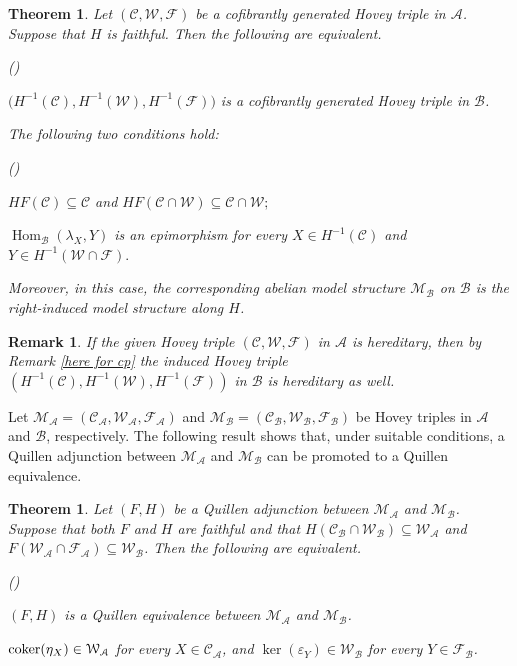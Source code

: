 \documentclass[12pt,twoside]{amsart}
\theoremstyle{bfupright head,slanted body}
\theoremstyle{bfupright head,upright body}
\theoremstyle{fixed bf head,slanted body}
\newtheorem{thm}[res]{Theorem}          \newtheorem*{thm*}{Theorem}
\theoremstyle{fixed bf head,upright body}
\newtheorem{rmk}[res]{Remark}           \newtheorem*{rmk*}{Remark}
\theoremstyle{numbered paragraph}
\newlength{\thmlistleft}        %
\newlength{\thmlistright}       %
\newlength{\thmlistpartopsep}   %
\newlength{\thmlisttopsep}      %
\newlength{\thmlistparsep}      %
\newlength{\thmlistitemsep}     %
\newcounter{eqc}
\newenvironment{eqc}{\begin{list}{\upshape (\textit{\roman{eqc}})}%
    {\usecounter{eqc}%
      \setlength{\leftmargin}{\thmlistleft}%
      \setlength{\labelwidth}{\thmlistleft}%
      \setlength{\rightmargin}{\thmlistright}%
      \setlength{\partopsep}{\thmlistpartopsep}%
      \setlength{\topsep}{\thmlisttopsep}%
      \setlength{\parsep}{\thmlistparsep}%
      \setlength{\itemsep}{\thmlistitemsep}}}%
  {\end{list}}%
\newcounter{prt}
\newenvironment{prt}{\begin{list}{\upshape (\alph{prt})}%
    {\usecounter{prt}%
      \setlength{\leftmargin}{\thmlistleft}%
      \setlength{\labelwidth}{\thmlistleft}%
      \setlength{\rightmargin}{\thmlistright}%
      \setlength{\partopsep}{\thmlistpartopsep}%
      \setlength{\topsep}{\thmlisttopsep}%
      \setlength{\parsep}{\thmlistparsep}%
      \setlength{\itemsep}{\thmlistitemsep}}}%
  {\end{list}}%
\numberwithin{equation}{res}
\newcommand{\coker}{\mbox{\rm coker}}
\newcommand{\calC}{\mathcal{C}}
\newcommand{\calW}{\mathcal{W}}
\newcommand{\calF}{\mathcal{F}}
\newcommand{\calA}{\mathcal{A}}
\newcommand{\calB}{\mathcal{B}}
\newcommand{\calM}{\mathcal{M}}
\newcommand{\Hom}{\operatorname{Hom}}
\begin{document}
\begin{thm}\label{HOVEY case1}
Let \((\calC,\calW,\calF)\) be a cofibrantly generated Hovey triple in \(\calA\). Suppose that \(H\) is faithful. Then the following are equivalent.
\begin{eqc}
\item
\(\bigl(H^{-1}(\calC),H^{-1}(\calW),H^{-1}(\calF)\bigr)\)
is a cofibrantly generated Hovey triple in \(\calB\).

\item The following two conditions hold:
\begin{prt}
\item
\(HF(\calC)\subseteq \calC\)
and
\(HF(\calC\cap\calW)\subseteq \calC\cap\calW;\)
\item
\(\Hom_{\calB}(\lambda_X,Y)\)
is an epimorphism for every
\(X\in H^{-1}(\calC)\)
and
\(Y\in H^{-1}(\calW\cap\calF).\)
\end{prt}
\end{eqc}
Moreover, in this case, the corresponding abelian model structure \(\calM_{\calB}\) on \(\calB\) is the right-induced model structure along \(H\).
\end{thm}

\begin{rmk}\label{here for ht}
If the given Hovey triple \((\calC,\calW,\calF)\) in \(\calA\) is hereditary, then by Remark \ref{here for cp} the induced Hovey triple \((H^{-1}(\calC),H^{-1}(\calW),H^{-1}(\calF))\) in \(\calB\) is hereditary as well.
\end{rmk}

Let \(\calM_\calA = (\calC_\calA,\calW_\calA,\calF_\calA)\) and \(\calM_\calB = (\calC_\calB,\calW_\calB,\calF_\calB)\) be Hovey triples in \(\calA\) and \(\calB\), respectively.
The following result shows that, under suitable conditions, a Quillen adjunction between \(\calM_\calA\) and \(\calM_\calB\) can be promoted to a Quillen equivalence.

\begin{thm} \label{Ho(M_A)=Ho(M_B)}
Let \((F, H)\) be a Quillen adjunction between \(\calM_\calA\) and \(\calM_\calB\).
Suppose that both \(F\) and \(H\) are faithful and that \(H(\calC_\calB \cap \calW_\calB) \subseteq \calW_\calA\) and \(F(\calW_\calA \cap \calF_\calA) \subseteq \calW_\calB\).
Then the following are equivalent.
\begin{eqc}
\item
\((F,H)\) is a Quillen equivalence between \(\calM_\calA\) and \(\calM_\calB\).
\item
\(\coker(\eta_X) \in \calW_\calA\) for every \(X\in\calC_\calA\), and
\(\ker(\varepsilon_Y) \in \calW_\calB\) for every \(Y\in\calF_\calB\).
\end{eqc}
\end{thm}
\end{document}

